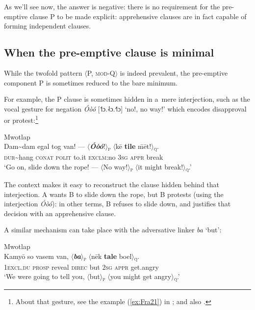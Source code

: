 \documentclass[output=paper,colorlinks,citecolor=brown]{langscibook}
\begin{document}
As we'll see now, the answer is negative: there is no requirement for the pre-emptive clause P to be made explicit: apprehensive clauses are in fact capable of forming independent clauses. 





\subsection{When the pre-emptive clause is minimal}
\label{subsec:minimal}
 
While the twofold pattern ${\langle}$P, \textsc{mod-}Q${\rangle}$ is indeed prevalent, the pre-emptive component P is sometimes reduced to the bare minimum. 

For example, the P clause is sometimes hidden in a~mere interjection, such as the vocal gesture for negation  \textit{Óòó} [\textsf{˦}ɔ.\textsf{˨}ɔ.\textsf{˧˥}ɔ]  `no!, no way!' which encodes disapproval or protest:\footnote{About that gesture, see the  example (\ref{ex:Fra21}) in ; and also \citet[220]{François2011}.}



\ea \label{ex:Fra43} \textnormal{Mwotlap}  \\
\gll Dam\textasciitilde dam egal tog van! --- ${\langle}$\textbf{\textit{Óòó}}!${\rangle}$\textnormal{\textsc{\textsubscript{p}}}  ${\langle}$kē \textbf{tile} \={m}ēt!${\rangle}$\textnormal{\textsc{\textsubscript{q}}}. \\
\textsc{dur}\textasciitilde hang \textsc{conat} \textsc{polit} to.it {} \textsc{exclm}:no \textsc{3sg} \textsc{appr} break \\
\glt `Go on, slide down the rope! --- $\langle$No way!$\rangle$\textsubscript{\textsc{p}} $\langle$it might break!$\rangle$\textsubscript{\textsc{q}}.' \\
\z


\noindent The context makes it easy to reconstruct the clause hidden behind that interjection. A wants B to slide down the rope, but B protests (using the interjection \textit{Óòó}): in other terms, B refuses to slide down, and justifies that decision with an apprehensive clause.

A similar mechanism can take place with the adversative linker \textit{ba} `but':
 
\ea \label{ex:Fra44} \textnormal{Mwotlap}  \\
\gll Kamyō so vasem van, ${\langle}$\textbf{\textit{ba}}${\rangle}$\textnormal{\textsc{\textsubscript{p}}}  ${\langle}$nēk \textbf{tale} boel${\rangle}$\textnormal{\textsc{\textsubscript{q}}}. \\
\textsc{1excl.du} \textsc{prosp} reveal \textsc{direc} but \textsc{2sg} \textsc{appr} get.angry \\
\glt `We were going to tell you, ${\langle}$but${\rangle}$\textsc{\textsubscript{p}} ${\langle}$you might get angry${\rangle}$\textsc{\textsubscript{q}}.' \\
\z
\end{document}

